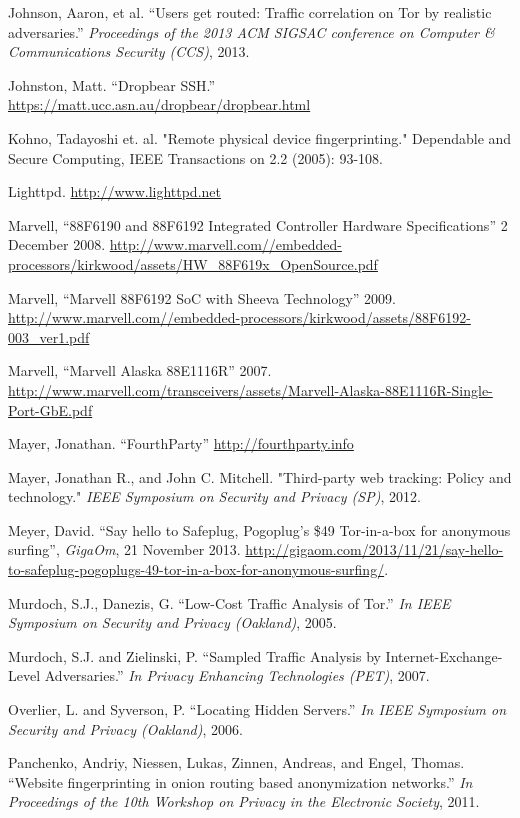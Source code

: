 \documentclass[conference]{IEEEtran}
\begin{document}
\begin{thebibliography}{1}
 Johnson, Aaron, et al. ``Users get routed: Traffic correlation on Tor by realistic adversaries.'' \emph{Proceedings of the 2013 ACM SIGSAC conference on Computer \& Communications Security (CCS)}, 2013.

 Johnston, Matt. ``Dropbear SSH.'' \url{https://matt.ucc.asn.au/dropbear/dropbear.html}

 Kohno, Tadayoshi et. al. "Remote physical device fingerprinting." Dependable and Secure Computing, IEEE Transactions on 2.2 (2005): 93-108.

 Lighttpd. \url{http://www.lighttpd.net}


 Marvell, ``88F6190 and 88F6192 Integrated Controller Hardware Specifications'' 2 December 2008. \url{http://www.marvell.com//embedded-processors/kirkwood/assets/HW_88F619x_OpenSource.pdf}

 Marvell, ``Marvell 88F6192 SoC with Sheeva Technology'' 2009. \url{http://www.marvell.com//embedded-processors/kirkwood/assets/88F6192-003_ver1.pdf}

 Marvell, ``Marvell Alaska 88E1116R'' 2007. \url{http://www.marvell.com/transceivers/assets/Marvell-Alaska-88E1116R-Single-Port-GbE.pdf}

 Mayer, Jonathan. ``FourthParty'' \url{http://fourthparty.info}

 Mayer, Jonathan R., and John C. Mitchell. "Third-party web tracking: Policy and technology." \emph{IEEE Symposium on Security and Privacy (SP)}, 2012.

 Meyer, David. ``Say hello to Safeplug, Pogoplug’s \$49 Tor-in-a-box for anonymous surfing'', \emph{GigaOm}, 21 November 2013. \url{http://gigaom.com/2013/11/21/say-hello-to-safeplug-pogoplugs-49-tor-in-a-box-for-anonymous-surfing/}.

 Murdoch, S.J., Danezis, G.  ``Low-Cost Traffic Analysis of Tor.'' \emph{In IEEE Symposium on Security and Privacy (Oakland)}, 2005.

 Murdoch, S.J. and Zielinski, P.  ``Sampled Traffic Analysis by Internet-Exchange-Level Adversaries.'' \emph{In Privacy Enhancing Technologies (PET)}, 2007.

 Overlier, L. and Syverson, P.  ``Locating Hidden Servers.'' \emph{In IEEE Symposium on Security and Privacy (Oakland)}, 2006.

 Panchenko, Andriy, Niessen, Lukas, Zinnen, Andreas, and Engel, Thomas.  ``Website fingerprinting in onion routing based anonymization networks.'' \emph{In Proceedings of the 10th Workshop on Privacy in the Electronic Society}, 2011.


\end{thebibliography}
\end{document}
